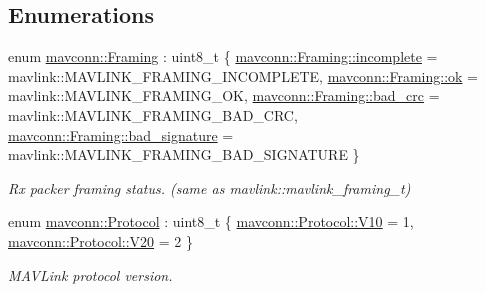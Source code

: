 \subsection*{Enumerations}
\begin{DoxyCompactItemize}
\item 
enum \mbox{\hyperlink{group__mavconn_gac93e6f8262bcc6008b4882ae6213f494}{mavconn\+::\+Framing}} \+: uint8\+\_\+t \{ \mbox{\hyperlink{group__mavconn_ggac93e6f8262bcc6008b4882ae6213f494a5ed4e9858ad8d239145ef285b6210a00}{mavconn\+::\+Framing\+::incomplete}} = mavlink\+::M\+A\+V\+L\+I\+N\+K\+\_\+\+F\+R\+A\+M\+I\+N\+G\+\_\+\+I\+N\+C\+O\+M\+P\+L\+E\+TE, 
\mbox{\hyperlink{group__mavconn_ggac93e6f8262bcc6008b4882ae6213f494a444bcb3a3fcf8389296c49467f27e1d6}{mavconn\+::\+Framing\+::ok}} = mavlink\+::M\+A\+V\+L\+I\+N\+K\+\_\+\+F\+R\+A\+M\+I\+N\+G\+\_\+\+OK, 
\mbox{\hyperlink{group__mavconn_ggac93e6f8262bcc6008b4882ae6213f494abaf1c3d199daf5f5b444664b81a08749}{mavconn\+::\+Framing\+::bad\+\_\+crc}} = mavlink\+::M\+A\+V\+L\+I\+N\+K\+\_\+\+F\+R\+A\+M\+I\+N\+G\+\_\+\+B\+A\+D\+\_\+\+C\+RC, 
\mbox{\hyperlink{group__mavconn_ggac93e6f8262bcc6008b4882ae6213f494adbfa03ea5df0b8979551ed84f97018e9}{mavconn\+::\+Framing\+::bad\+\_\+signature}} = mavlink\+::M\+A\+V\+L\+I\+N\+K\+\_\+\+F\+R\+A\+M\+I\+N\+G\+\_\+\+B\+A\+D\+\_\+\+S\+I\+G\+N\+A\+T\+U\+RE
 \}
\begin{DoxyCompactList}\small\item\em Rx packer framing status. (same as {\ttfamily mavlink\+::mavlink\+\_\+framing\+\_\+t}) \end{DoxyCompactList}\item 
enum \mbox{\hyperlink{group__mavconn_gae4e5498ebfd232dcad75be0f8a168ff3}{mavconn\+::\+Protocol}} \+: uint8\+\_\+t \{ \mbox{\hyperlink{group__mavconn_ggae4e5498ebfd232dcad75be0f8a168ff3a3ffc64fa10df9a884ba82f3e49e8282e}{mavconn\+::\+Protocol\+::\+V10}} = 1, 
\mbox{\hyperlink{group__mavconn_ggae4e5498ebfd232dcad75be0f8a168ff3aba9161e2ae9f747e361fa824ca0d0337}{mavconn\+::\+Protocol\+::\+V20}} = 2
 \}
\begin{DoxyCompactList}\small\item\em M\+A\+V\+Link protocol version. \end{DoxyCompactList}\end{DoxyCompactItemize}
